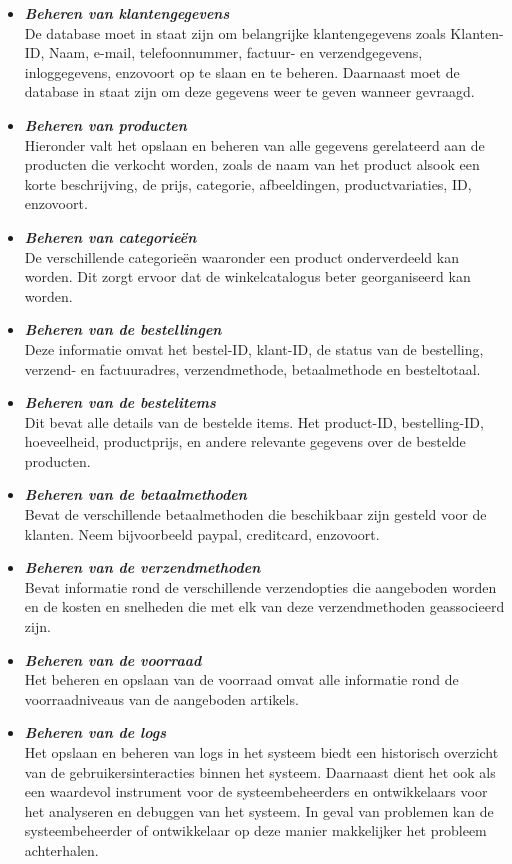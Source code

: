 \begin{itemize}
    \item \textbf{\textit{Beheren van klantengegevens}} \\
    De database moet in staat zijn om belangrijke klantengegevens zoals Klanten-ID, Naam, e-mail, telefoonnummer, factuur- en verzendgegevens, inloggegevens, enzovoort op te slaan en te beheren. Daarnaast moet de database in staat zijn om deze gegevens weer te geven wanneer gevraagd.
    \item \textbf{\textit{Beheren van producten}} \\
    Hieronder valt het opslaan en beheren van alle gegevens gerelateerd aan de producten die verkocht worden, zoals de naam van het product alsook een korte beschrijving, de prijs, categorie, afbeeldingen, productvariaties, ID, enzovoort.
    \item \textbf{\textit{Beheren van categorieën}} \\
    De verschillende categorieën waaronder een product onderverdeeld kan worden. Dit zorgt ervoor dat de winkelcatalogus beter georganiseerd kan worden.
    \item \textbf{\textit{Beheren van de bestellingen}} \\
    Deze informatie omvat het bestel-ID, klant-ID, de status van de bestelling, verzend- en factuuradres, verzendmethode, betaalmethode en besteltotaal.
    \item \textbf{\textit{Beheren van de bestelitems}} \\
    Dit bevat alle details van de bestelde items. Het product-ID, bestelling-ID, hoeveelheid, productprijs, en andere relevante gegevens over de bestelde producten.
    \item \textbf{\textit{Beheren van de betaalmethoden}} \\
    Bevat de verschillende betaalmethoden die beschikbaar zijn gesteld voor de klanten. Neem bijvoorbeeld paypal, creditcard, enzovoort.
    \item \textbf{\textit{Beheren van de verzendmethoden}} \\
    Bevat informatie rond de verschillende verzendopties die aangeboden worden en de kosten en snelheden die met elk van deze verzendmethoden geassocieerd zijn.
    \item \textbf{\textit{Beheren van de voorraad}} \\
    Het beheren en opslaan van de voorraad omvat alle informatie rond de voorraadniveaus van de aangeboden artikels. 
    \item \textbf{\textit{Beheren van de logs}} \\
    Het opslaan en beheren van logs in het systeem biedt een historisch overzicht van de gebruikersinteracties binnen het systeem. Daarnaast dient het ook als een waardevol instrument voor de systeembeheerders en ontwikkelaars voor het analyseren en debuggen van het systeem. In geval van problemen kan de systeembeheerder of ontwikkelaar op deze manier makkelijker het probleem achterhalen.
\end{itemize}

